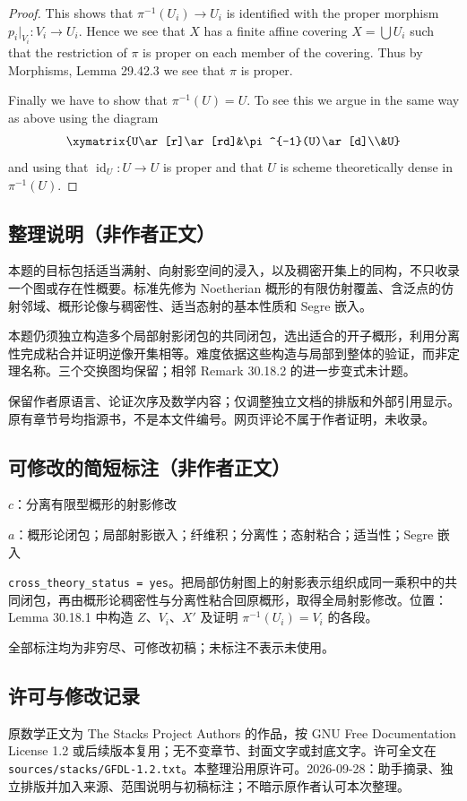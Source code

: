 \documentclass[UTF8,11pt]{ctexart}
\theoremstyle{definition}
\DeclareMathOperator{\id}{id}
\begin{document}
\begin{proof}
This shows that $\pi^{-1}(U_i)\to U_i$ is identified with the proper morphism $p_i|_{V_i}:V_i\to U_i$. Hence we see that $X$ has a finite affine covering $X=\bigcup U_i$ such that the restriction of $\pi$ is proper on each member of the covering. Thus by Morphisms, Lemma 29.42.3 we see that $\pi$ is proper.

Finally we have to show that $\pi^{-1}(U)=U$. To see this we argue in the same way as above using the diagram
\[\xymatrix{U\ar[r]\ar[rd]&\pi^{-1}(U)\ar[d]\\&U}\]
and using that $\id_U:U\to U$ is proper and that $U$ is scheme theoretically dense in $\pi^{-1}(U)$.
\end{proof}

\subsection*{整理说明（非作者正文）}
本题的目标包括适当满射、向射影空间的浸入，以及稠密开集上的同构，不只收录一个图或存在性概要。标准先修为 Noetherian 概形的有限仿射覆盖、含泛点的仿射邻域、概形论像与稠密性、适当态射的基本性质和 Segre 嵌入。

本题仍须独立构造多个局部射影闭包的共同闭包，选出适合的开子概形，利用分离性完成粘合并证明逆像开集相等。难度依据这些构造与局部到整体的验证，而非定理名称。三个交换图均保留；相邻 Remark 30.18.2 的进一步变式未计题。

保留作者原语言、论证次序及数学内容；仅调整独立文档的排版和外部引用显示。原有章节号均指源书，不是本文件编号。网页评论不属于作者证明，未收录。
\subsection*{可修改的简短标注（非作者正文）}
$c$：分离有限型概形的射影修改

$a$：概形论闭包；局部射影嵌入；纤维积；分离性；态射粘合；适当性；Segre 嵌入

\texttt{cross\_theory\_status = yes}。把局部仿射图上的射影表示组织成同一乘积中的共同闭包，再由概形论稠密性与分离性粘合回原概形，取得全局射影修改。位置：Lemma 30.18.1 中构造 $Z$、$V_i$、$X'$ 及证明 $\pi^{-1}(U_i)=V_i$ 的各段。

全部标注均为非穷尽、可修改初稿；未标注不表示未使用。
\subsection*{许可与修改记录}
原数学正文为 The Stacks Project Authors 的作品，按 GNU Free Documentation License 1.2 或后续版本复用；无不变章节、封面文字或封底文字。许可全文在 \texttt{sources/stacks/GFDL-1.2.txt}。本整理沿用原许可。2026-09-28：助手摘录、独立排版并加入来源、范围说明与初稿标注；不暗示原作者认可本次整理。
\end{document}
